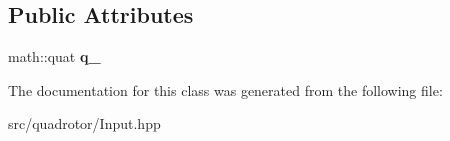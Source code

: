 \subsection*{\-Public \-Attributes}
\begin{DoxyCompactItemize}
\item 
\hypertarget{classInput_1_1QuatConst_a256ac5c9c9c3f1ff3967fd3df398e24c}{math\-::quat {\bfseries q\-\_\-}}\label{classInput_1_1QuatConst_a256ac5c9c9c3f1ff3967fd3df398e24c}

\end{DoxyCompactItemize}


\-The documentation for this class was generated from the following file\-:\begin{DoxyCompactItemize}
\item 
src/quadrotor/\-Input.\-hpp\end{DoxyCompactItemize}
